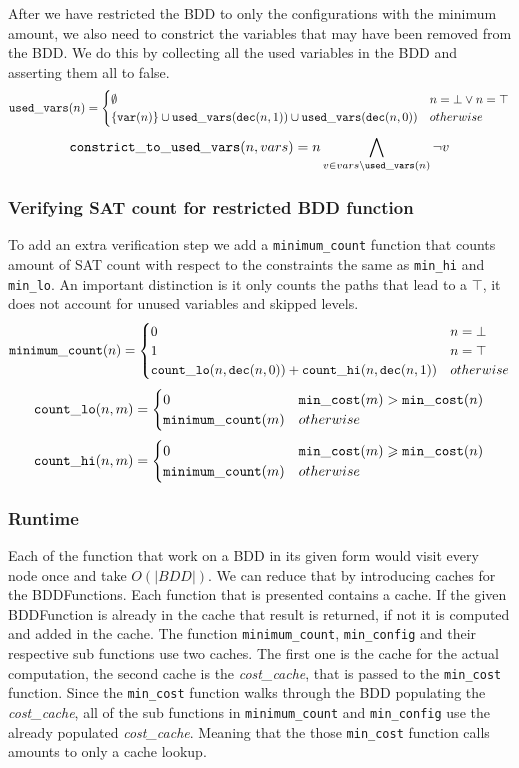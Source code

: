 After we have restricted the BDD to only the configurations with the minimum amount, we also need to constrict the variables that may have been removed from the BDD.
We do this by collecting all the used variables in the BDD and asserting them all to false.
\[
\mathtt{used\_vars}(n) =
\begin{cases}
\emptyset & n = \bot \vee n = \top \\
\{\mathtt{var}(n)\} \cup \mathtt{used\_vars}(\mathtt{dec}(n, 1)) \cup \mathtt{used\_vars}(\mathtt{dec}(n, 0)) & otherwise
\end{cases}
\]
\[
\mathtt{constrict\_to\_used\_vars}(n,vars) = n \bigwedge_{v \in vars\backslash \mathtt{used\_vars}(n)} \neg v
\]


\subsubsection{Verifying SAT count for restricted BDD function}
To add an extra verification step we add a \verb|minimum_count| function that counts amount of SAT count with respect to the constraints the same as \verb|min_hi| and \verb|min_lo|. An important distinction is it only counts the paths that lead to a $\top$, it does not account for unused variables and skipped levels.
\[
\mathtt{minimum\_count}(n) = 
\begin{cases}
0 & n = \bot \\
1 & n = \top \\
\mathtt{count\_lo}(n,\mathtt{dec}(n, 0)) + \mathtt{count\_hi}(n,\mathtt{dec}(n, 1)) & otherwise\\
\end{cases}
\]
\[
\mathtt{count\_lo}(n,m) =
\begin{cases}
0 & \mathtt{min\_cost}(m) > \mathtt{min\_cost}(n) \\
\mathtt{minimum\_count}(m) & otherwise\\
\end{cases}
\]
\[
\mathtt{count\_hi}(n,m) = 
\begin{cases}
0 & \mathtt{min\_cost}(m) \geqslant \mathtt{min\_cost}(n) \\
\mathtt{minimum\_count}(m) & otherwise\\
\end{cases}
\]

\subsubsection{Runtime}
Each of the function that work on a BDD in its given form would visit every node once and take $O(|BDD|)$. We can reduce that by introducing caches for the BDDFunctions.
Each function that is presented contains a cache. If the given BDDFunction is already in the cache that result is returned, if not it is computed and added in the cache.
The function \verb|minimum_count|, \verb|min_config| and their respective sub functions use two caches.
The first one is the cache for the actual computation, the second cache is the \textit{cost\_cache}, that is passed to the \verb|min_cost| function.
Since the \verb|min_cost| function walks through the BDD populating the \textit{cost\_cache}, all of the sub functions in \verb|minimum_count| and \verb|min_config| use the already populated \textit{cost\_cache}.
Meaning that the those \verb|min_cost| function calls amounts to only a cache lookup.


